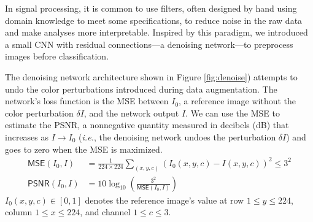 \documentclass[justified]{article}
\begin{document}
  In signal processing, it is common to use filters, often designed by hand using domain knowledge to meet some specifications, to reduce noise in the raw data and make analyses more interpretable.
  Inspired by this paradigm, we introduced a small CNN with residual connections---a denoising network---to preprocess images before classification.

  The denoising network architecture shown in Figure \ref{fig:denoise}) attempts to undo the color perturbations introduced during data augmentation.
  The network's loss function is the MSE between $I_0$, a reference image without the color perturbation $\delta I$, and the network output $I$.
  We can use the MSE to estimate the PSNR, a nonnegative quantity measured in decibels (dB) that increases as $I \to I_0$ (\textit{i.e.}, the denoising network undoes the perturbation $\delta I$) and goes to zero when the MSE is maximized.
  \begin{equation}
    \begin{split}
      \mathsf{MSE}(I_0, I) &= \frac{1}{224 \times 224} \sum_{(x, y, c)} \left(I_0(x, y, c) - I(x, y, c)\right)^2 \leq 3^2 \\
      \mathsf{PSNR}(I_0, I) &= 10 \log_{10} \left(\frac{3^2}{\mathsf{MSE}(I_0, I)}\right)
    \end{split}
  \end{equation}
  $I_0(x, y, c) \in [0, 1]$ denotes the reference image's value at row $1 \leq y \leq 224$, column $1 \leq x \leq 224$, and channel $1 \leq c \leq 3$.
\end{document}
